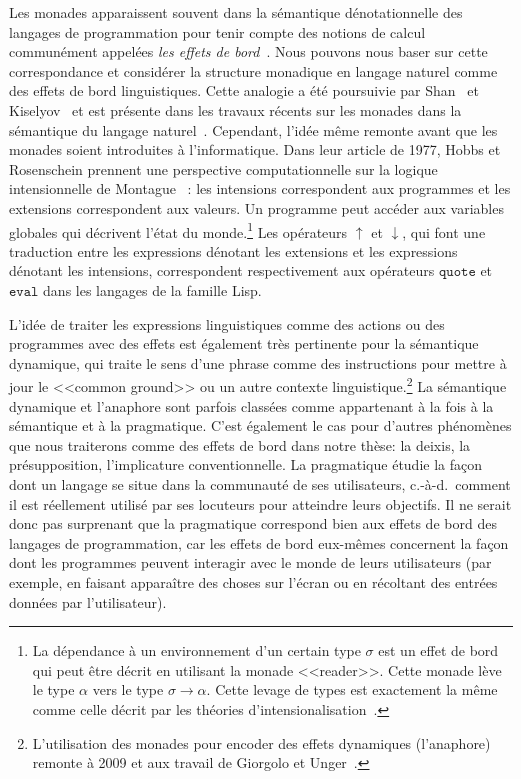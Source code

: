 Les monades apparaissent souvent dans la sémantique dénotationnelle des langages
de programmation pour tenir compte des notions de calcul communément appelées
\emph {les effets de bord}~\cite{moggi1991notions}. Nous pouvons nous baser sur
cette correspondance et considérer la structure monadique en langage naturel
comme des effets de bord linguistiques. Cette analogie a été poursuivie par
Shan~\cite{shan2005linguistic,shan2005thesis} et
Kiselyov~\cite{kiselyov2008call} et est présente dans les travaux récents sur
les monades dans la sémantique du langage
naturel~\cite{giorgolo2012monads,charlow2014semantics}. Cependant, l'idée même
remonte avant que les monades soient introduites à l'informatique. Dans leur
article de 1977, Hobbs et Rosenschein prennent une perspective computationnelle
sur la logique intensionnelle de Montague~\cite{montague1973proper} : les
intensions correspondent aux programmes et les extensions correspondent aux
valeurs. Un programme peut accéder aux variables globales qui décrivent l'état
du monde.\footnote{La dépendance à un environnement d'un certain type $\sigma$
  est un effet de bord qui peut être décrit en utilisant la monade <<reader>>.
  Cette monade lève le type $\alpha$ vers le type $\sigma \to \alpha$. Cette
  levage de types est exactement la même comme celle décrit par les théories
  d'intensionalisation~\cite{ben2007semantics,de2013note}.} Les opérateurs
$\uparrow$ et $\downarrow$, qui font une traduction entre les expressions
dénotant les extensions et les expressions dénotant les intensions,
correspondent respectivement aux opérateurs $\texttt{quote} $ et $\texttt{eval}$
dans les langages de la famille Lisp.

L'idée de traiter les expressions linguistiques comme des actions ou des
programmes avec des effets est également très pertinente pour la sémantique
dynamique, qui traite le sens d'une phrase comme des instructions pour mettre à
jour le <<common ground>> ou un autre contexte
linguistique.\footnote{L'utilisation des monades pour encoder des effets
  dynamiques (l'anaphore) remonte à 2009 et aux travail de Giorgolo et
  Unger~\cite{giorgolo2009coreference,unger2012dynamic}.} La sémantique
dynamique et l'anaphore sont parfois classées comme appartenant à la fois à la
sémantique et à la pragmatique. C'est également le cas pour d'autres phénomènes
que nous traiterons comme des effets de bord dans notre thèse: la deixis, la
présupposition, l'implicature conventionnelle. La pragmatique étudie la façon
dont un langage se situe dans la communauté de ses utilisateurs, c.-à-d.\ comment
il est réellement utilisé par ses locuteurs pour atteindre leurs objectifs. Il
ne serait donc pas surprenant que la pragmatique correspond bien aux effets de
bord des langages de programmation, car les effets de bord eux-mêmes concernent
la façon dont les programmes peuvent interagir avec le monde de leurs
utilisateurs (par exemple, en faisant apparaître des choses sur l'écran ou en
récoltant des entrées données par l'utilisateur).


